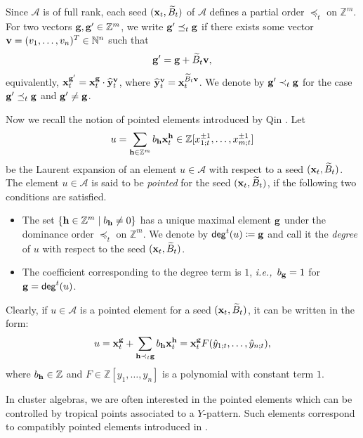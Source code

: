 \documentclass[12pt]{amsart}
\theoremstyle{definition}
\theoremstyle{remark}
\numberwithin{equation}{section}
\newcommand{\opname}[1]{\operatorname{\mathsf{#1}}}
\newcommand{\de}{\opname{deg}}
\newcommand{\ie}{\textit{i.e.,}\ }
\begin{document}
 Since $\mathcal A$ is of full rank, each seed $({\bf x}_t,\widetilde B_t)$ of $\mathcal A$ defines a partial order $\preceq_t$ on $\mathbb Z^m$. For two vectors ${\bf g},{\bf g}'\in\mathbb Z^m$, we write ${\bf g}'\preceq_t{\bf g}$ if there exists some vector ${\bf v}=(v_1,\ldots,v_n)^T\in\mathbb N^n$ such that $${\bf g}'={\bf g}+\widetilde B_t{\bf v},$$ equivalently, ${\bf x}_t^{{\bf g}'}={\bf x}_t^{\bf g}\cdot \widehat {\bf y}_t^{\bf v}$, where $\widehat {\bf y}_t^{\bf v}={\bf x}_t^{\widetilde B_t{\bf v}}$. We denote by ${\bf g}'\prec_t{\bf g}$ for the case ${\bf g}'\preceq_t{\bf g}$ and ${\bf g}'\neq {\bf g}$.


Now we recall the notion of pointed elements introduced by Qin \cite{Qin_2017}. Let 
 $$u=\sum_{{\bf h}\in\mathbb Z^m}b_{\bf h}{\bf x}_t^{\bf h}\in \mathbb Z[x_{1;t}^{\pm 1},\ldots,x_{m;t}^{\pm 1}]$$
be the Laurent expansion of an element $u\in\mathcal A$ with respect to a seed 
 $({\bf x}_t,\widetilde B_t)$. The element $u\in\mathcal A$ is said to be {\em pointed} for the seed $({\bf x}_t,\widetilde B_t)$, if the following two conditions are satisfied.
\begin{itemize}
\item The set $\{{\bf h}\in\mathbb Z^m\mid b_{\bf h}\neq 0\}$ has a unique maximal element ${\bf g}$ under the dominance order $\preceq_t$ on $\mathbb Z^m$. We denote by $\de^t(u) \coloneqq   {\bf g}$ and call it the {\em degree} of $u$ with respect to the seed $({\bf x}_t,\widetilde B_t)$.
    \item The coefficient corresponding to the degree term is $1$,  \ie $b_{\bf g}=1$ for ${\bf g}=\de^t(u)$.
\end{itemize}


Clearly, if $u\in\mathcal A$ is a pointed element for a seed $({\bf x}_t,\widetilde B_t)$, it can be written in the form:
$$u={\bf x}_t^{\bf g}+\sum_{{\bf h}\prec_t {\bf g}}b_{\bf h}{\bf x}_t^{\bf h}={\bf x}_t^{\bf g}F(\hat y_{1;t},\ldots,\hat y_{n;t}),$$
where $b_{\bf h}\in\mathbb Z$ and $F\in\mathbb Z[y_1,\ldots,y_n]$ is a polynomial with constant term $1$.



In cluster algebras, we are often interested in the pointed elements which can be controlled by tropical points associated to a $Y$-pattern. Such elements correspond to compatibly pointed elements introduced in \cite{qin_2019}.
\end{document}
